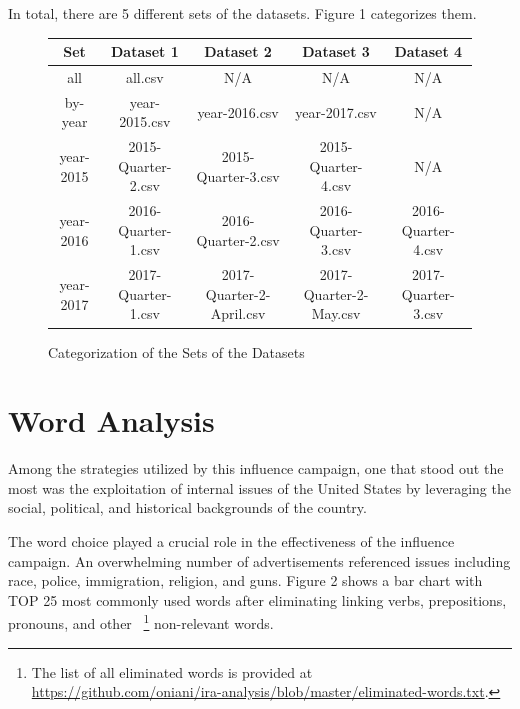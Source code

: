 \documentclass{article}
\begin{document}
\bigskip

In total, there are 5 different sets of the datasets.
Figure 1 categorizes them.

\begin{figure}[H]
  \centering
  \begin{tabular}{*{5}{c}}
    \toprule
    Set & Dataset 1 & Dataset 2 & Dataset 3 & Dataset 4\\
    \midrule
    all  & all.csv & N/A & N/A & N/A\\
    \midrule
    by-year & year-2015.csv & year-2016.csv & year-2017.csv & N/A\\
    \midrule
    year-2015 & 2015-Quarter-2.csv & 2015-Quarter-3.csv & 2015-Quarter-4.csv & N/A\\
    \midrule
    year-2016 & 2016-Quarter-1.csv & 2016-Quarter-2.csv & 2016-Quarter-3.csv & 2016-Quarter-4.csv\\
    \midrule
    year-2017 & 2017-Quarter-1.csv & 2017-Quarter-2-April.csv & 2017-Quarter-2-May.csv & 2017-Quarter-3.csv\\
    \bottomrule
  \end{tabular}
  \caption{Categorization of the Sets of the Datasets}
\end{figure}


\section*{\centering Word Analysis}

Among the strategies utilized by this influence campaign, one that stood out
the most was the exploitation of internal issues of the United States by
leveraging the social, political, and historical backgrounds of the country.

\bigskip

The word choice played a crucial role in the effectiveness of the influence
campaign. An overwhelming number of advertisements referenced issues including
race, police, immigration, religion, and guns. Figure 2 shows a bar chart with
TOP 25 most commonly used words after eliminating linking verbs, prepositions,
pronouns, and other
~\footnote{The list of all eliminated words is provided at\\
\url{https://github.com/oniani/ira-analysis/blob/master/eliminated-words.txt}.}
non-relevant words.
\end{document}
